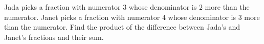 Jada picks a fraction with numerator $3$ whose denominator is $2$ more than the numerator. Janet picks a fraction with numerator $4$ whose denominator is $3$ more than the numerator. Find the product of the difference between Jada's and Janet's fractions and their sum.
